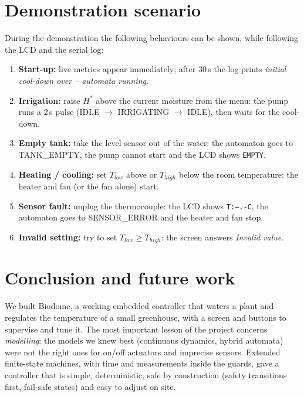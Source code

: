 \documentclass[10pt,a4paper,twocolumn]{article}
\begin{document}
\section{Demonstration scenario}
During the demonstration the following behaviours can be shown, while following the
LCD and the serial log:
\begin{enumerate}
  \item \textbf{Start-up:} live metrics appear immediately; after 30\,s the log
        prints \emph{initial cool-down over -- automata running}.
  \item \textbf{Irrigation:} raise $H^*$ above the current moisture from the menu:
        the pump runs a 2\,s pulse (IDLE $\to$ IRRIGATING $\to$ IDLE), then waits for
        the cool-down.
  \item \textbf{Empty tank:} take the level sensor out of the water: the automaton
        goes to TANK\_EMPTY, the pump cannot start and the LCD shows \texttt{EMPTY}.
  \item \textbf{Heating / cooling:} set $T_{low}$ above or $T_{high}$ below the room
        temperature: the heater and fan (or the fan alone) start.
  \item \textbf{Sensor fault:} unplug the thermocouple: the LCD shows
        \texttt{T:--.-C}, the automaton goes to SENSOR\_ERROR and the heater and fan
        stop.
  \item \textbf{Invalid setting:} try to set $T_{low}\ge T_{high}$: the screen
        answers \emph{Invalid value}.
\end{enumerate}

\section{Conclusion and future work}\label{sec:conclusion}
We built Biodome, a working embedded controller that waters a plant and regulates the
temperature of a small greenhouse, with a screen and buttons to supervise and tune it.
The most important lesson of the project concerns \emph{modelling}: the models we knew
best (continuous dynamics, hybrid automata) were not the right ones for on/off
actuators and imprecise sensors. Extended finite-state machines, with time and
measurements inside the guards, gave a controller that is simple, deterministic,
safe by construction (safety transitions first, fail-safe states) and easy to adjust
on site.
\end{document}
